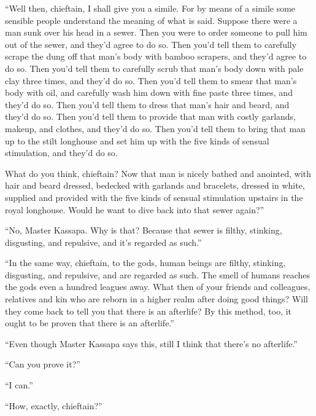 \documentclass[12pt,openany]{book}%
\begin{document}
“Well then, chieftain, I shall give you a simile. For by means of a simile some sensible people understand the meaning of what is said. Suppose there were a man sunk over his head in a sewer. Then you were to order someone to pull him out of the sewer, and they’d agree to do so. Then you’d tell them to carefully scrape the dung off that man’s body with bamboo scrapers, and they’d agree to do so. Then you’d tell them to carefully scrub that man’s body down with pale clay three times, and they’d do so. Then you’d tell them to smear that man’s body with oil, and carefully wash him down with fine paste three times, and they’d do so. Then you’d tell them to dress that man’s hair and beard, and they’d do so. Then you’d tell them to provide that man with costly garlands, makeup, and clothes, and they’d do so. Then you’d tell them to bring that man up to the stilt longhouse and set him up with the five kinds of sensual stimulation, and they’d do so. 

What do you think, chieftain? Now that man is nicely bathed and anointed, with hair and beard dressed, bedecked with garlands and bracelets, dressed in white, supplied and provided with the five kinds of sensual stimulation upstairs in the royal longhouse. Would he want to dive back into that sewer again?” 

“No, Master Kassapa. Why is that? Because that sewer is filthy, stinking, disgusting, and repulsive, and it’s regarded as such.” 

“In the same way, chieftain, to the gods, human beings are filthy, stinking, disgusting, and repulsive, and are regarded as such. The smell of humans reaches the gods even a hundred leagues away. What then of your friends and colleagues, relatives and kin who are reborn in a higher realm after doing good things? Will they come back to tell you that there is an afterlife? By this method, too, it ought to be proven that there is an afterlife.” 

“Even though Master Kassapa says this, still I think that there’s no afterlife.” 

“Can you prove it?” 

“I can.” 

“How, exactly, chieftain?” 
\end{document}
